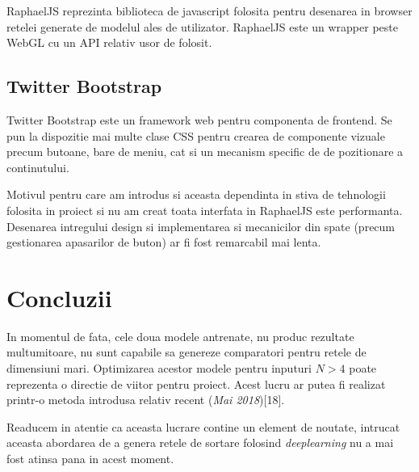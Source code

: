 \documentclass[12pt]{article}
\begin{document}
RaphaelJS reprezinta biblioteca de javascript folosita pentru desenarea in browser retelei generate de modelul ales de utilizator. RaphaelJS este un wrapper peste WebGL cu un API relativ usor de folosit.


\subsection{Twitter Bootstrap}

Twitter Bootstrap este un framework web pentru componenta de frontend. Se pun la dispozitie mai multe clase CSS pentru crearea de componente vizuale precum butoane, bare de meniu, cat si un mecanism specific de de pozitionare a continutului.

Motivul pentru care am introdus si aceasta dependinta in stiva de tehnologii folosita in proiect si nu am creat toata interfata in RaphaelJS este performanta. Desenarea intregului design si implementarea si mecanicilor din spate (precum gestionarea apasarilor de buton) ar fi fost remarcabil mai lenta.

\pagebreak

\section{Concluzii}

 In momentul de fata, cele doua modele antrenate, nu produc rezultate multumitoare, nu sunt capabile sa genereze comparatori pentru retele de dimensiuni mari. Optimizarea acestor modele pentru inputuri $N>4$ poate reprezenta o directie de viitor pentru proiect. Acest lucru ar putea fi realizat printr-o metoda introdusa relativ recent (\textit{Mai 2018})[18].

Readucem in atentie ca aceasta lucrare contine un element de noutate, intrucat aceasta abordarea de a genera retele de sortare folosind \textit{deeplearning} nu a mai fost atinsa pana in acest moment. 
  
 
\end{document}
